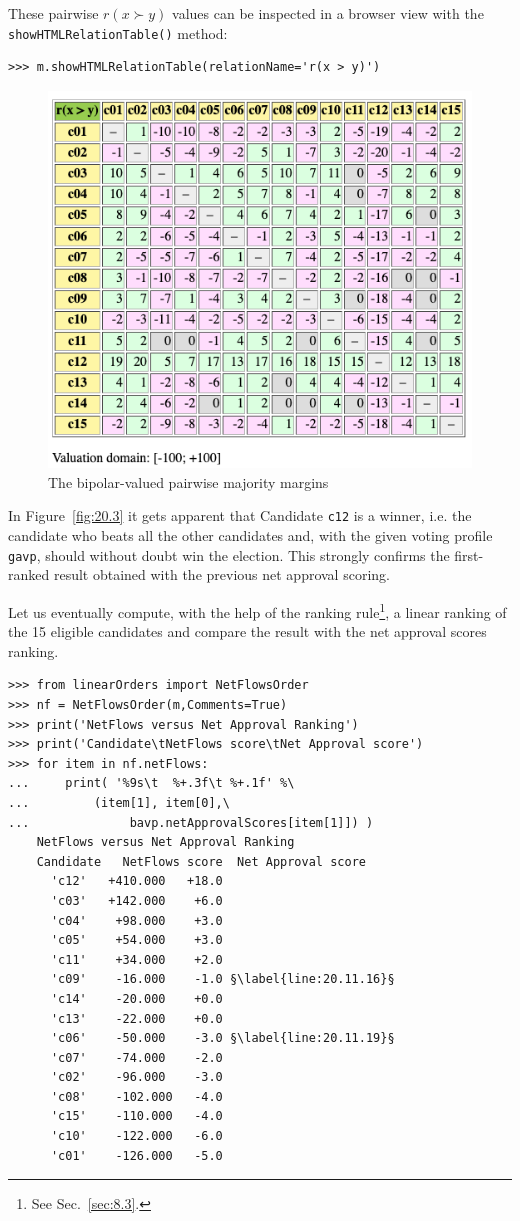 These pairwise $r(x \succ y)$ values can be inspected in a browser view with the \texttt{showHTMLRelationTable()} method: 
\begin{lstlisting}
>>> m.showHTMLRelationTable(relationName='r(x > y)')
\end{lstlisting}
\begin{figure}[ht]
\includegraphics[width=0.8\hsize]{Figures/20-3-majMargAV.png}
\caption{The bipolar-valued pairwise majority margins} 
\label{fig:20.3}       %
\end{figure}

In Figure~\vref{fig:20.3} it gets apparent that Candidate \texttt{c12} is a \Condorcet winner, i.e. the candidate who beats all the other candidates and, with the given voting profile \texttt{gavp}, should without doubt win the election. This strongly confirms the first-ranked result obtained with the previous net approval scoring. 

Let us eventually compute, with the help of the \NetFlows ranking rule\footnote{See Sec.~\ref{sec:8.3}.}, a linear ranking of the 15 eligible candidates and compare the result with the net approval scores ranking.
\begin{lstlisting}[caption={Comparing the net approval and the \NetFlows rankings},label=list:20.11]
>>> from linearOrders import NetFlowsOrder
>>> nf = NetFlowsOrder(m,Comments=True)
>>> print('NetFlows versus Net Approval Ranking')
>>> print('Candidate\tNetFlows score\tNet Approval score')
>>> for item in nf.netFlows:
...     print( '%9s\t  %+.3f\t %+.1f' %\
...	        (item[1], item[0],\
...              bavp.netApprovalScores[item[1]]) ) 
    NetFlows versus Net Approval Ranking
    Candidate	NetFlows score	Net Approval score
      'c12'	  +410.000	 +18.0
      'c03'	  +142.000	  +6.0
      'c04'	   +98.000	  +3.0
      'c05'	   +54.000	  +3.0
      'c11'	   +34.000	  +2.0
      'c09'	   -16.000	  -1.0 §\label{line:20.11.16}§
      'c14'	   -20.000	  +0.0
      'c13'	   -22.000	  +0.0
      'c06'	   -50.000	  -3.0 §\label{line:20.11.19}§
      'c07'	   -74.000	  -2.0
      'c02'	   -96.000	  -3.0
      'c08'	   -102.000	  -4.0
      'c15'	   -110.000	  -4.0
      'c10'	   -122.000	  -6.0
      'c01'	   -126.000	  -5.0
\end{lstlisting}

